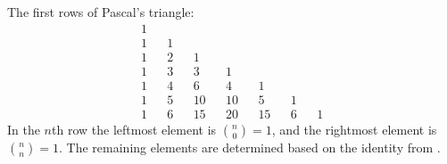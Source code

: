 The first rows of Pascal's triangle:
\[
    \begin{array}{ccccccccccccc}
        1 \\
        1 && 1 \\
        1 && 2 && 1 \\
        1 && 3 && 3 && 1 \\
        1 && 4 && 6 && 4 && 1 \\
        1 && 5 && 10 && 10 && 5 && 1 \\
        1 && 6 && 15 && 20 && 15 && 6 && 1
    \end{array}
\]
In the $n$th row the leftmost element is $\binom{n}{0}=1$, and the rightmost element is $\binom{n}{n}=1$.
The remaining elements are determined based on the identity from .
